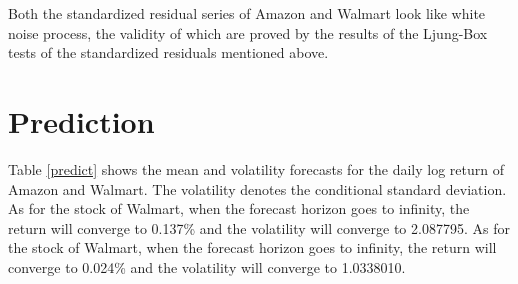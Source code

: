 \documentclass[paper=a4, fontsize=11pt]{article}
\begin{document}
Both the standardized residual series of Amazon and Walmart look like white noise process, the validity of which are proved by the results of the Ljung-Box tests of the standardized residuals mentioned above.

\section{Prediction}
Table \ref{predict} shows the mean and volatility forecasts for the daily log return of Amazon and Walmart. The volatility denotes the conditional standard deviation. As for the stock of Walmart, when the forecast horizon goes to infinity, the return will converge to 0.137\% and the volatility will converge to 2.087795. As for the stock of Walmart, when the forecast horizon goes to infinity, the return will converge to 0.024\% and the volatility will converge to 1.0338010. 
\end{document}
